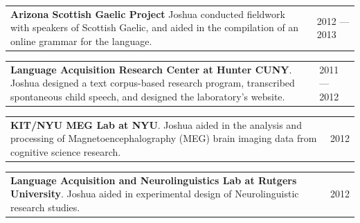 \documentclass{cv} %
\begin{document}


\begin{tabular}{@{}p{}p{}@{}}
  {\bf Arizona Scottish Gaelic Project}
  Joshua conducted fieldwork with speakers of Scottish Gaelic, and aided in the compilation of an online grammar for the language.
  &
\hfill  {2012 --- 2013}
\end{tabular}


\begin{tabular}{@{}p{}p{}@{}}
  {\bf Language Acquisition Research Center at Hunter CUNY}.
  Joshua designed a text corpus-based research program, transcribed spontaneous child speech, and designed the laboratory's website.
  &
\hfill  {2011 --- 2012}
\end{tabular}

\begin{tabular}{@{}p{}p{}@{}}
  {\bf KIT/NYU MEG Lab at NYU}.
  Joshua aided in the analysis and processing of Magnetoencephalography (MEG) brain imaging data from cognitive science research.
  &
\hfill {2012}
\end{tabular}


\begin{tabular}{@{}p{}p{}@{}}
  {\bf Language Acquisition and Neurolinguistics Lab at Rutgers University}.
  Joshua aided in experimental design of Neurolinguistic research studies.
  &
\hfill {2012}
\end{tabular}
\end{document}
